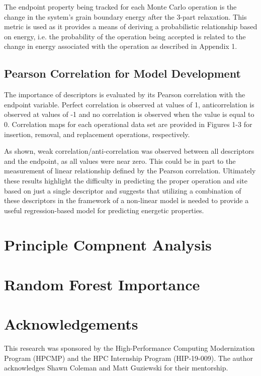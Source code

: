 \documentclass[aip,reprint,longbibliography,amsmath,amssymb,twocolumn,superscriptaddress]{revtex4-1}
\begin{document}
The endpoint property being tracked for each Monte Carlo operation is the change in the system’s grain boundary energy after the 3-part relaxation. 
%
This metric is used as it provides a means of deriving a probabilistic relationship based on energy, i.e. the probability of the operation being accepted is related to the change in energy associated with the operation as described in Appendix 1. 

\subsection{Pearson Correlation for Model Development}

The importance of descriptors is evaluated by its Pearson correlation with the endpoint variable. Perfect correlation is observed at values of 1, anticorrelation is observed at values of -1 and no correlation is observed when the value is equal to 0. 
%
Correlation maps for each operational data set are provided in Figures 1-3 for insertion, removal, and replacement operations, respectively.  


As shown, weak correlation/anti-correlation was observed between all descriptors and the endpoint, as all values were near zero.  
%
This could be in part to the measurement of linear relationship defined by the Pearson correlation.  
%
Ultimately these results highlight the difficulty in predicting the proper operation and site based on just a single descriptor and suggests that utilizing a combination of these descriptors in the framework of a non-linear model is needed to provide a useful regression-based model for predicting energetic properties. 

\section{Principle Compnent Analysis}

\section{Random Forest Importance}

\section{Acknowledgements}
This research was sponsored by the High-Performance Computing Modernization Program (HPCMP) and the HPC Internship Program (HIP-19-009). 
%
The author acknowledges Shawn Coleman and Matt Guziewski for their mentorship.

 
\end{document}
